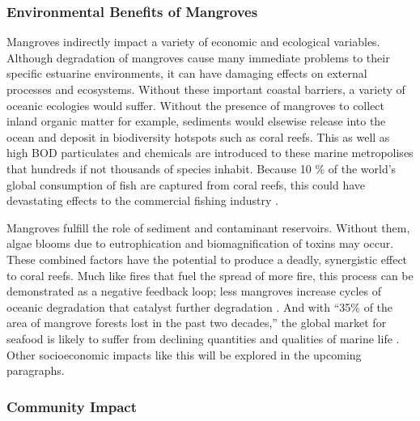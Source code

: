\subsubsection{Environmental Benefits of Mangroves}
  Mangroves indirectly impact a variety of economic and ecological variables. Although degradation of mangroves cause many immediate problems to their specific estuarine environments, it can have damaging effects on external processes and ecosystems. Without these  important coastal barriers, a variety of oceanic ecologies would suffer. Without the presence of mangroves to collect inland organic matter for example, sediments would elsewise release into the ocean and deposit in biodiversity hotspots such as coral reefs. This as well as high BOD particulates and chemicals are introduced to these marine metropolises that hundreds if not thousands of species inhabit. Because 10 \% of the world's global consumption of fish are captured from coral reefs, this could have devastating effects to the commercial fishing industry \citep{naylor2000effect}. 

Mangroves fulfill the role of sediment and contaminant reservoirs. Without them, algae blooms due to eutrophication and biomagnification of toxins may occur. These combined factors have the potential to produce a deadly, synergistic effect to coral reefs. Much like fires that fuel the spread of more fire, this process can be demonstrated as a negative feedback loop; less mangroves increase cycles of oceanic degradation that catalyst further degradation \citep{hoegh1999climate}. And with ``35\% of the area of mangrove forests lost in the past two decades,'' the global market for seafood is likely to suffer from declining quantities and qualities of marine life \citep{valiela2001mangrove}. Other socioeconomic impacts like this will be explored in the upcoming paragraphs.


\subsubsection{Community Impact}

